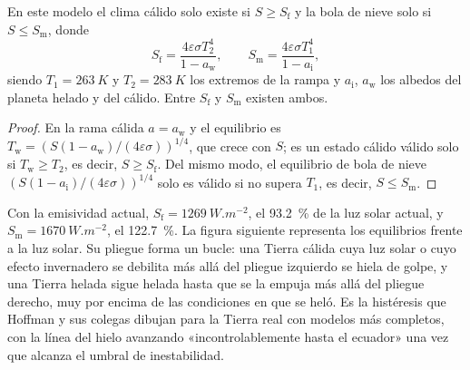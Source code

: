 \begin{proposition}\label{prop:b2:precambrian-earth:tipping}
En este modelo el clima cálido solo existe si $S \ge S_{\text{f}}$ y la bola de nieve solo si
$S \le S_{\text{m}}$, donde
\[
  S_{\text{f}} = \frac{4\varepsilon\sigma T_2^4}{1 - a_{\text{w}}}, \qquad
  S_{\text{m}} = \frac{4\varepsilon\sigma T_1^4}{1 - a_{\text{i}}},
\]
siendo $T_1 = \qty{263}{K}$ y $T_2 = \qty{283}{K}$ los extremos de la rampa y $a_{\text{i}}$,
$a_{\text{w}}$ los albedos del planeta helado y del cálido. Entre $S_{\text{f}}$ y
$S_{\text{m}}$ existen ambos.
\end{proposition}

\begin{proof}
En la rama cálida $a = a_{\text{w}}$ y el equilibrio es $T_{\text{w}} = (S(1 -
a_{\text{w}})/(4\varepsilon\sigma))^{1/4}$, que crece con $S$; es un estado cálido válido solo
si $T_{\text{w}} \ge T_2$, es decir, $S \ge S_{\text{f}}$. Del mismo modo, el equilibrio de bola de nieve
$(S(1 - a_{\text{i}})/(4\varepsilon\sigma))^{1/4}$ solo es válido si no supera $T_1$, es
decir, $S \le S_{\text{m}}$.
\end{proof}

Con la emisividad actual, $S_{\text{f}} = \qty{1269}{W.m^{-2}}$, el \qty{93.2}{\percent} de la luz solar
actual, y $S_{\text{m}} = \qty{1670}{W.m^{-2}}$, el \qty{122.7}{\percent}. La figura siguiente
representa los equilibrios frente a la luz solar. Su pliegue forma un bucle: una Tierra cálida cuya luz solar
o cuyo efecto invernadero se debilita más allá del pliegue izquierdo se hiela de golpe, y una Tierra helada sigue helada
hasta que se la empuja más allá del pliegue derecho, muy por encima de las condiciones en que se heló. Es
la histéresis que Hoffman y sus colegas dibujan para la Tierra real con modelos más completos,
con la línea del hielo avanzando «incontrolablemente hasta el ecuador» una vez que alcanza el umbral de
inestabilidad.

